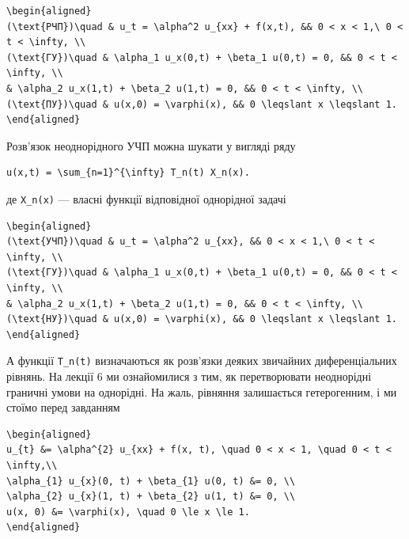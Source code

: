 \documentclass[
  ukrainian,
]{article}
\begin{document}
\begin{verbatim}
\begin{aligned}
(\text{РЧП})\quad & u_t = \alpha^2 u_{xx} + f(x,t), && 0 < x < 1,\ 0 < t < \infty, \\
(\text{ГУ})\quad & \alpha_1 u_x(0,t) + \beta_1 u(0,t) = 0, && 0 < t < \infty, \\
& \alpha_2 u_x(1,t) + \beta_2 u(1,t) = 0, && 0 < t < \infty, \\
(\text{ПУ})\quad & u(x,0) = \varphi(x), && 0 \leqslant x \leqslant 1.
\end{aligned}
\end{verbatim}

Розв'язок неоднорідного УЧП можна шукати у вигляді ряду

\begin{verbatim}
u(x,t) = \sum_{n=1}^{\infty} T_n(t) X_n(x).
\end{verbatim}

де \texttt{X\_n(x)} --- власні функції відповідної однорідної задачі

\begin{verbatim}
\begin{aligned}
(\text{УЧП})\quad & u_t = \alpha^2 u_{xx}, && 0 < x < 1,\ 0 < t < \infty, \\
(\text{ГУ})\quad & \alpha_1 u_x(0,t) + \beta_1 u(0,t) = 0, && 0 < t < \infty, \\
& \alpha_2 u_x(1,t) + \beta_2 u(1,t) = 0, && 0 < t < \infty, \\
(\text{НУ})\quad & u(x,0) = \varphi(x), && 0 \leqslant x \leqslant 1.
\end{aligned}
\end{verbatim}

А функції \texttt{T\_n(t)} визначаються як розв'язки деяких звичайних
диференціальних рівнянь. На лекції 6 ми ознайомилися з тим, як
перетворювати неоднорідні граничні умови на однорідні. На жаль, рівняння
залишається гетерогенним, і ми стоїмо перед завданням

\begin{verbatim}
\begin{aligned}
u_{t} &= \alpha^{2} u_{xx} + f(x, t), \quad 0 < x < 1, \quad 0 < t < \infty,\\
\alpha_{1} u_{x}(0, t) + \beta_{1} u(0, t) &= 0, \\
\alpha_{2} u_{x}(1, t) + \beta_{2} u(1, t) &= 0, \\
u(x, 0) &= \varphi(x), \quad 0 \le x \le 1.
\end{aligned}
\end{verbatim}
\end{document}

